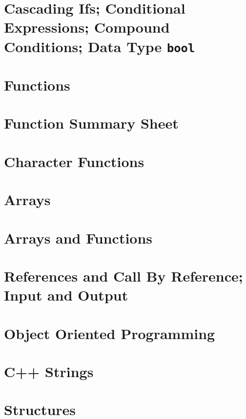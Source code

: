 \documentclass{report}
\begin{document}
    \section{Cascading Ifs; Conditional Expressions; Compound Conditions; Data Type \texttt{bool}}


    \pagebreak \bigbreak \noidennt
    \section{Functions}
    \pagebreak \bigbreak \noidennt

    \section{Function Summary Sheet}
    \pagebreak \bigbreak \noidennt

    \section{Character Functions}
    \pagebreak \bigbreak \noidennt

    \section{Arrays}
    \pagebreak \bigbreak \noidennt

    \section{Arrays and Functions}
    \pagebreak \bigbreak \noidennt

    \section{References and Call By Reference; Input and Output}
    \pagebreak \bigbreak \noidennt

    \section{Object Oriented Programming}
    \pagebreak \bigbreak \noidennt

    \section{C++ Strings}
    \pagebreak \bigbreak \noidennt

    \section{Structures}
    \pagebreak \bigbreak \noindent 

    
\end{document}
